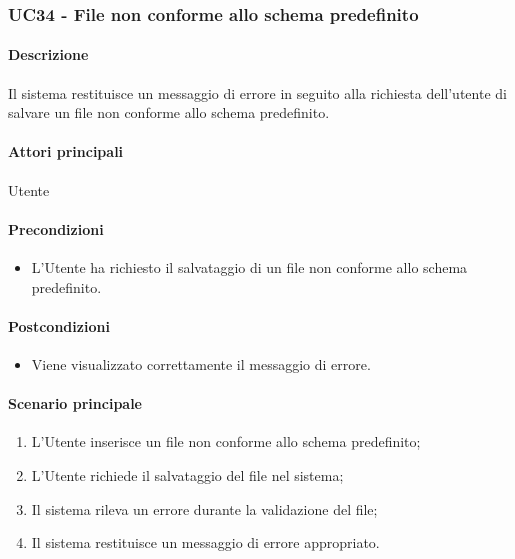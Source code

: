 \subsubsection{UC34 - File non conforme allo schema predefinito}\label{UC34}
\paragraph*{Descrizione}
Il sistema restituisce un messaggio di errore in seguito alla richiesta dell'utente di salvare un file non conforme allo schema predefinito.

\paragraph*{Attori principali}
Utente

\paragraph*{Precondizioni}
\begin{itemize}
  \item L'Utente ha richiesto il salvataggio di un file non conforme allo schema predefinito.
\end{itemize}

\paragraph*{Postcondizioni}
\begin{itemize}
  \item Viene visualizzato correttamente il messaggio di errore.
\end{itemize}

\paragraph*{Scenario principale}
\begin{enumerate}
  \item L'Utente inserisce un file non conforme allo schema predefinito;
  \item L'Utente richiede il salvataggio del file nel sistema;
  \item Il sistema rileva un errore durante la validazione del file;
  \item Il sistema restituisce un messaggio di errore appropriato.
\end{enumerate}
